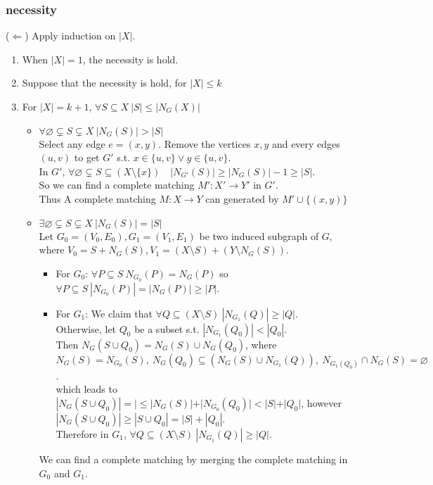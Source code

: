 \documentclass{article}
\begin{document}
\subsubsection{necessity}
($\Leftarrow$)\quad
Apply induction on $|X|$.
\begin{enumerate}
	\item When $|X|=1$, the necessity is hold.
	\item Suppose that the necessity is hold, for $|X|\leq k$
	\item For $|X|=k+1$, $\forall S\subseteq X\ |S|\leq |N_G(X)|$
	      \begin{itemize}
		      \item $\forall \varnothing\subsetneq S\subsetneq X\ |N_G(S)|>|S|$\\
		            Select any edge $e=(x,y)$. Remove the vertices $x,y$ and every edges $(u,v)$ to get $G'$ s.t. $x\in\{u,v\}\lor y\in\{u,v\}$.\\
		            In $G'$, $\forall \varnothing\subsetneq S\subseteq (X\setminus \{x\})\quad |N_{G'}(S)|\geq |N_{G}(S)|-1\geq |S|$.\\
		            So we can find a complete matching  $M':X'\to Y'$ in $G'$.\\
		            Thus A complete matching $M:X\to Y$ can generated by $M'\cup \{(x,y)\}$
		      \item $\exists \varnothing\subsetneq S\subsetneq X\ |N_G(S)|=|S|$\\
		            Let $G_0=(V_0,E_0),G_1=(V_1,E_1)$ be two induced subgraph of $G$, where $V_0=S+N_G(S),V_1=(X\setminus S)+ (Y\setminus N_G(S))$.
		            \begin{itemize}
			            \item For $G_0$: $\forall P\subseteq S\ N_{G_0}(P)=N_{G}(P)$ so $\forall P\subseteq S\ |N_{G_0}(P)|=|N_{G}(P)|\geq |P|$.
			            \item For $G_1$: We claim that $\forall Q\subseteq (X\setminus S)\ |N_{G_1}(Q)|\geq |Q|$.\\
			                  Otherwise, let $Q_0$ be a subset s.t. $|N_{G_1}(Q_0)|<|Q_0|$.\\
			                  Then $N_{G}(S\cup Q_0)=N_{G}(S)\cup N_{G}(Q_0)$, where $N_{G}(S)=N_{G_0}(S),\ N_{G}(Q_0)\subseteq (N_{G}(S)\cup N_{G_1}(Q)),\ N_{G_1(Q_0)}\cap N_G(S)=\varnothing$.\\
			                  which leads to $|N_{G}(S\cup Q_0)|=|\leq |N_G(S)|+|N_{G_0}(Q_0)| < |S|+|Q_0|$, however $|N_{G}(S\cup Q_0)|\geq |S\cup Q_0|=|S|+|Q_0|$.\\
			                  Therefore in $G_1$, $\forall Q\subseteq (X\setminus S)\ |N_{G_1}(Q)|\geq |Q|$.\\
		            \end{itemize}
		            We can find a complete matching by merging the complete matching in $G_0$ and $G_1$.
	      \end{itemize}
\end{enumerate}
\end{document}
